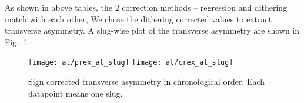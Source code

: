 \begin{comment}
    & 343.4 & 154.8 & 155.1
    & 379.9 & 91.0  & 91.4
    & 493.9 & 93.0  & 94.1
    & 345.4 & 152.9 & 153.0
    & 387.2 & 91.3  & 91.9
    & 495.3 & 93.5  & 95.3
    & 344.5 & 153.7 & 153.9
    & 383.6 & 91.2  & 91.7
    & 494.5 & 93.2  & 94.6


\begin{table}
    \scriptsize
    \begin{tabular}{c | c c c | c c c}
	\hline
	\multirow{2}{*}{Target}	& \multicolumn{3}{c|}{Minirun Average (ppm)} & \multicolumn{3}{c}{Mulplot (ppm)}	\\
	\cline{2-7}
	    & raw	& reg	& dit	& raw	& reg	& dit	\\
	\hline
	\multicolumn{7}{c}{IHWP IN}   \\
	\hline
	C	& 659.82  & 558.10  & 558.71  & 659.84  & 557.97  & 558.56	\\
	Ca40    & 933.96  & 717.96  & 719.28  & 933.69  & 718.04  & 719.32	\\
	Ca48    & 994.35  & 775.30  & 776.19  & 994.78  & 775.61  & 776.50	\\
	Pb	& 1262.78 & 1168.89 & 1170.02 & 1261.95 & 1168.23 & 1169.35	\\
	\hline
	\multicolumn{7}{c}{IHWP OUT}   \\
	\hline
	C	& 8607.92 & 1558.19	& 8789.05 & 1313.51	& 8791.48 & 1314.60	 \\
	Ca40    & 8023.61 & 1751.48	& 7967.37 & 1353.29	& 7994.17 & 1355.00	 \\
	Ca48    & 7267.11 & 1516.31	& 8257.84 & 1180.23	& 8254.72 & 1183.33	 \\
	Pb	& 2089.10 & 2456.43	& 2420.15 & 2263.44	& 2456.87 & 2266.23	 \\
	\hline
	\multicolumn{7}{c}{COMBINED}   \\
	\hline
	C	& 661.92  & 558.72  & 559.27  & 661.73  & 558.75  & 559.29	\\
	Ca40    & 932.99  & 718.38  & 719.52  & 932.93  & 718.36  & 719.47	\\
	Ca48    & 996.46  & 775.93  & 777.46  & 996.67  & 776.15  & 777.63	\\
	Pb	& 1260.29 & 1163.94 & 1165.22 & 1259.54 & 1163.30 & 1164.57	\\
	\hline
    \end{tabular}
    \caption{Mini-wise average and mulplot average values for each target}
\end{table}
\end{comment}
As shown in above tables, the 2 correction methods -- regression and dithering 
match with each other,
We chose the dithering corrected values to extract transverse asymmetry.
A slug-wise plot of the transverse asymmetry are shown in Fig.~\ref{fig:AT_slug} 
\begin{figure}[H]
    \centering
    \texttt{[image: at/prex\_at\_slug]}
    \texttt{[image: at/crex\_at\_slug]}
    \caption{Sign corrected transverse asymmetry in chronological order. 
    Each datapoint means one slug.}
    \label{fig:AT_slug}
\end{figure}


